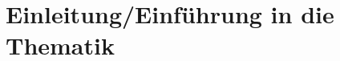 \documentclass[Bachelor, BMR, ngerman]{twbook}
\begin{document}
{{{    \newcommand{\citep}{\citeasnoun}%
    \newcommand{\acessedthrough}{Available at:}%
    \newcommand{\acessedthroughp}{Available through:}%
    \newcommand{\acessedat}{Accessed}%
    \newcommand{\singlepage}{p.}%
    \newcommand{\multiplepages}{pp.}%
    \newcommand{\chapternr}{Ch.}%
    \renewcommand{\harvardand}{\&}%
    \newcommand{\abstractonly}{Abstract only}
    \newcommand{\edition}{~edition}%
}}}

\maketitle




\chapter{Einleitung/Einführung in die Thematik}
\end{document}
